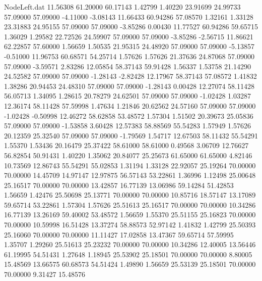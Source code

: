 \begin{filecontents}{NodeLeft.dat}
  11.56308   61.20000   60.17143     1.42799    1.40220   23.91699   24.99733   57.09000   57.09000   -4.11000   -3.08143
  11.66433   60.94286   57.08570     1.32161    1.33128   23.31883   24.95155   57.09000   57.09000   -3.85286    0.00430
  11.77527   60.94286   59.65715     1.36029    1.29582   22.72526   24.59907   57.09000   57.09000   -3.85286   -2.56715
  11.86621   62.22857   57.60000     1.56659    1.50535   21.95315   24.48920   57.09000   57.09000   -5.13857   -0.51000
  11.96753   60.68571   54.25714     1.57626    1.57626   21.37636   24.87068   57.09000   57.09000   -3.59571    2.83286
  12.05854   58.37143   59.91428     1.56337    1.53758   21.14290   24.52582   57.09000   57.09000   -1.28143   -2.82428
  12.17967   58.37143   57.08572     1.41832    1.38286   20.94453   24.48310   57.09000   57.09000   -1.28143    0.00428
  12.27074   58.11428   56.05713     1.34095    1.28615   20.78279   24.62501   57.09000   57.09000   -1.02428    1.03287
  12.36174   58.11428   57.59998     1.47634    1.21846   20.62562   24.57160   57.09000   57.09000   -1.02428   -0.50998
  12.46272   58.62858   53.48572     1.57304    1.51502   20.39673   25.05836   57.09000   57.09000   -1.53858    3.60428
  12.57383   58.88569   55.54283     1.57949    1.57626   20.12359   25.32540   57.09000   57.09000   -1.79569    1.54717
  12.67503   58.11432   55.54291     1.55370    1.53436   20.16479   25.37422   58.61000   58.61000    0.49568    3.06709
  12.76627   56.82854   50.91431     1.40220    1.35062   20.84077   25.25673   61.65000   61.65000    4.82146   10.73569
  12.86743   55.54291   55.02853     1.31194    1.33128   22.92057   25.19264   70.00000   70.00000   14.45709   14.97147
  12.97875   56.57143   53.22861     1.36996    1.12498   25.00648   25.16517   70.00000   70.00000   13.42857   16.77139
  13.06986   59.14284   51.42853     1.56659    1.42476   25.50698   25.13771   70.00000   70.00000   10.85716   18.57147
  13.17089   59.65714   53.22861     1.57304    1.57626   25.51613   25.16517   70.00000   70.00000   10.34286   16.77139
  13.26169   59.40002   53.48572     1.56659    1.55370   25.51155   25.16823   70.00000   70.00000   10.59998   16.51428
  13.37274   58.88573   52.97142     1.41832    1.42799   25.50393   25.16060   70.00000   70.00000   11.11427   17.02858
  13.47367   59.65714   57.59995     1.35707    1.29260   25.51613   25.23232   70.00000   70.00000   10.34286   12.40005
  13.56446   61.19995   54.51431     1.27648    1.18945   25.53902   25.18501   70.00000   70.00000    8.80005   15.48569
  13.66575   60.68573   54.51424     1.49890    1.56659   25.53139   25.18501   70.00000   70.00000    9.31427   15.48576

\end{filecontents}
